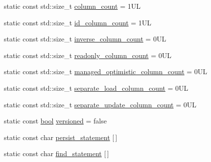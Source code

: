 \begin{DoxyCompactItemize}
\item 
static const std\+::size\+\_\+t \hyperlink{classodb_1_1access_1_1object__traits__impl_3_01_1_1_object_class_00_01id__pgsql_01_4_a2ab83c68fc05c25fac054d5292d33854}{column\+\_\+count} = 1\+U\+L
\item 
static const std\+::size\+\_\+t \hyperlink{classodb_1_1access_1_1object__traits__impl_3_01_1_1_object_class_00_01id__pgsql_01_4_ae4e8696b7864bd4c0b890a386fe0f575}{id\+\_\+column\+\_\+count} = 1\+U\+L
\item 
static const std\+::size\+\_\+t \hyperlink{classodb_1_1access_1_1object__traits__impl_3_01_1_1_object_class_00_01id__pgsql_01_4_aa183f72bd80894426828ccca279e9ac3}{inverse\+\_\+column\+\_\+count} = 0\+U\+L
\item 
static const std\+::size\+\_\+t \hyperlink{classodb_1_1access_1_1object__traits__impl_3_01_1_1_object_class_00_01id__pgsql_01_4_a5dc389fec6ae9e0a7f257ec49e41d2b8}{readonly\+\_\+column\+\_\+count} = 0\+U\+L
\item 
static const std\+::size\+\_\+t \hyperlink{classodb_1_1access_1_1object__traits__impl_3_01_1_1_object_class_00_01id__pgsql_01_4_ab6946734bfb28448453d7fa2b38350b2}{managed\+\_\+optimistic\+\_\+column\+\_\+count} = 0\+U\+L
\item 
static const std\+::size\+\_\+t \hyperlink{classodb_1_1access_1_1object__traits__impl_3_01_1_1_object_class_00_01id__pgsql_01_4_a2335135a4248804acdac5b20dc548ed2}{separate\+\_\+load\+\_\+column\+\_\+count} = 0\+U\+L
\item 
static const std\+::size\+\_\+t \hyperlink{classodb_1_1access_1_1object__traits__impl_3_01_1_1_object_class_00_01id__pgsql_01_4_a92c70722158781c7c76ec5d1b4ed0dce}{separate\+\_\+update\+\_\+column\+\_\+count} = 0\+U\+L
\item 
static const \hyperlink{classodb_1_1access_1_1object__traits_3_01_1_1_object_class_01_4_a1f9680cb812834a08dfbf195bd41a057}{bool} \hyperlink{classodb_1_1access_1_1object__traits__impl_3_01_1_1_object_class_00_01id__pgsql_01_4_aa7d37ed39a824128e872431b9273bd7c}{versioned} = false
\item 
static const char \hyperlink{classodb_1_1access_1_1object__traits__impl_3_01_1_1_object_class_00_01id__pgsql_01_4_a9de9d4cebc2146ed096d5ad0f2e77c23}{persist\+\_\+statement} \mbox{[}$\,$\mbox{]}
\item 
static const char \hyperlink{classodb_1_1access_1_1object__traits__impl_3_01_1_1_object_class_00_01id__pgsql_01_4_a268843b90dffcf55920cd4d348d6c2d2}{find\+\_\+statement} \mbox{[}$\,$\mbox{]}

\end{DoxyCompactItemize}
